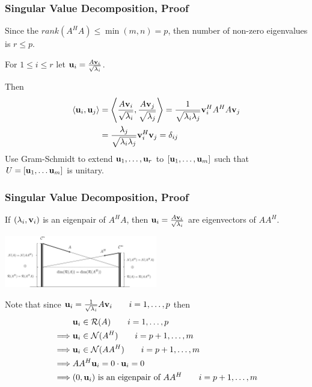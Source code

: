 \documentclass{beamer}
\begin{document}
\begin{frame}\frametitle{Singular Value Decomposition, Proof}
	Since the $rank(A^HA) \leq \min(m,n) = p$, then number of non-zero eigenvalues is $r \leq p$.
	
	For $1 \leq i \leq r$ let $\mathbf{u}_i = \frac{A\mathbf{v}_i}{\sqrt{\lambda_i}}$.
	
	Then 
	\begin{align*}
		\left<\mathbf{u}_i,\mathbf{u}_j \right> &= \left<\frac{A\mathbf{v}_i}{\sqrt{\lambda_i}}, \frac{A\mathbf{v}_j}{\sqrt{\lambda_j}} \right>
		= \frac{1}{\sqrt{\lambda_i\lambda_j}}\mathbf{v}_i^HA^HA\mathbf{v}_j\\
		&= \frac{\lambda_j}{\sqrt{\lambda_i\lambda_j}}\mathbf{v}_i^H\mathbf{v}_j 
		=  \delta_{ij}
	\end{align*}
	Use Gram-Schmidt to extend $\mathbf{u}_1,\ldots,\mathbf{u}_r$ to $[\mathbf{u}_1,\ldots,\mathbf{u}_m]$ such that $U = [\mathbf{u}_1, \ldots \mathbf{u}_m]$ is unitary.

\end{frame}

\begin{frame}\frametitle{Singular Value Decomposition, Proof}
		\begin{lemma}
			If $(\lambda_i, \mathbf{v}_i)$ is an eigenpair of $A^H A$, then 
			$\mathbf{u}_i=\frac{A\mathbf{v}_i}{\sqrt{\lambda_i}}$ are eigenvectors of  $AA^H$.
		\end{lemma}
		\begin{center}
			\includegraphics[width=0.5\textwidth]{figures/chap7_fundamental_subspace_1}
		\end{center}
			\begin{proofstart}
				Note that since $\mathbf{u}_i = \frac{1}{\sqrt{\lambda_i}}A\mathbf{v}_i \qquad i = 1,\ldots,p$ then
				\begin{align*}
				& \mathbf{u}_i \in \mathcal{R}(A) \qquad i = 1, \ldots, p \\
				\implies & \mathbf{u}_i \in \mathcal{N}(A^H) \qquad i = p+1, \ldots, m \\
				\implies & \mathbf{u}_i \in \mathcal{N}(AA^H) \qquad i = p+1, \ldots, m \\
				\implies & AA^H\mathbf{u}_i = 0\cdot \mathbf{u}_i = 0 \\
				\implies & (0,\mathbf{u}_i) \text{~is an eigenpair of~} AA^H \qquad i = p+1,\ldots,m
				\end{align*}
			\end{proofstart}
\end{frame}
\end{document}
